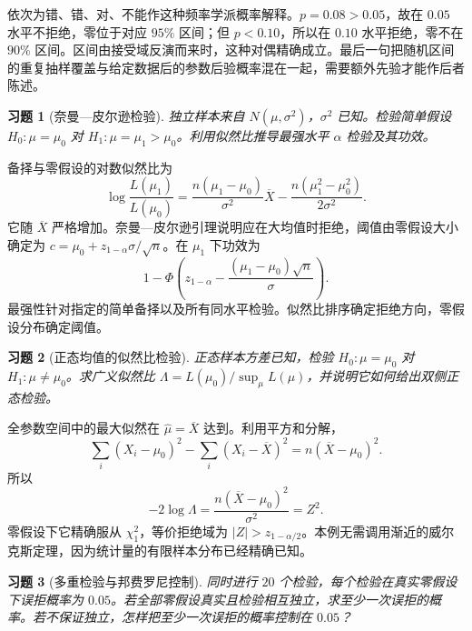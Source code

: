 \documentclass[12pt,fontset=fandol]{ctexart}
\newtheorem{exercise}{习题}[section]
\begin{document}
\begin{solve}\label{a:M-F-C10}依次为错、错、对、不能作这种频率学派概率解释。$p=0.08>0.05$，故在 $0.05$ 水平不拒绝，零位于对应 $95\%$ 区间；但 $p<0.10$，所以在 $0.10$ 水平拒绝，零不在 $90\%$ 区间。区间由接受域反演而来时，这种对偶精确成立。最后一句把随机区间的重复抽样覆盖与给定数据后的参数后验概率混在一起，需要额外先验才能作后者陈述。\end{solve}

\begin{exercise}[奈曼—皮尔逊检验]\label{q:B14.1}
独立样本来自 $N(\mu,\sigma^2)$，$\sigma^2$ 已知。检验简单假设 $H_0:\mu=\mu_0$ 对 $H_1:\mu=\mu_1>\mu_0$。利用似然比推导最强水平 $\alpha$ 检验及其功效。\par{}
\end{exercise}

\begin{solve}\label{a:B14.1}备择与零假设的对数似然比为\[\log\frac{L(\mu_1)}{L(\mu_0)}=\frac{n(\mu_1-\mu_0)}{\sigma^2}\overline X-\frac{n(\mu_1^2-\mu_0^2)}{2\sigma^2}.\]它随 $\overline X$ 严格增加。奈曼—皮尔逊引理说明应在大均值时拒绝，阈值由零假设大小确定为 $c=\mu_0+z_{1-\alpha}\sigma/\sqrt n$。在 $\mu_1$ 下功效为\[1-\Phi\left(z_{1-\alpha}-\frac{(\mu_1-\mu_0)\sqrt n}{\sigma}\right).\]最强性针对指定的简单备择以及所有同水平检验。似然比排序确定拒绝方向，零假设分布确定阈值。\end{solve}

\begin{exercise}[正态均值的似然比检验]\label{q:B14.2}
正态样本方差已知，检验 $H_0:\mu=\mu_0$ 对 $H_1:\mu\ne\mu_0$。求广义似然比 $\Lambda=L(\mu_0)/\sup_\mu L(\mu)$，并说明它如何给出双侧正态检验。\par{}
\end{exercise}

\begin{solve}\label{a:B14.2}全参数空间中的最大似然在 $\widehat\mu=\overline X$ 达到。利用平方和分解，\[\sum_i(X_i-\mu_0)^2-\sum_i(X_i-\overline X)^2=n(\overline X-\mu_0)^2.\]所以\[-2\log\Lambda=\frac{n(\overline X-\mu_0)^2}{\sigma^2}=Z^2.\]零假设下它精确服从 $\chi^2_1$，等价拒绝域为 $|Z|>z_{1-\alpha/2}$。本例无需调用渐近的威尔克斯定理，因为统计量的有限样本分布已经精确已知。\end{solve}

\begin{exercise}[多重检验与邦费罗尼控制]\label{q:B14.3}
同时进行 $20$ 个检验，每个检验在真实零假设下误拒概率为 $0.05$。若全部零假设真实且检验相互独立，求至少一次误拒的概率。若不保证独立，怎样把至少一次误拒的概率控制在 $0.05$？\par{}
\end{exercise}
\end{document}
